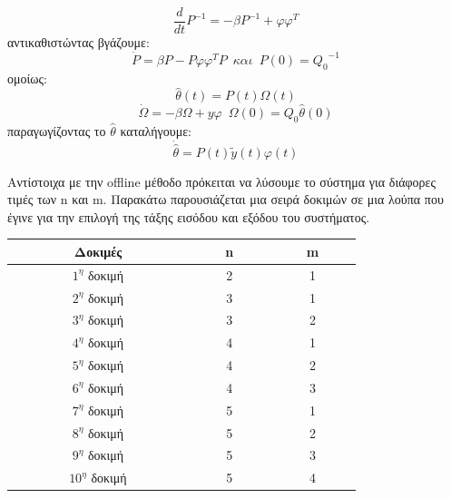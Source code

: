 \documentclass{article}
\begin{document}
\begin{equation*}
\frac{d}{dt}P^{-1} = -β P^{-1} + φφ^T
\end{equation*}
αντικαθιστώντας βγάζουμε:
\begin{equation*}
\boxed{\dot{P}=βP - Pφ φ^T P}\enspace και\enspace P(0)={Q_0}^{-1}
\end{equation*}
ομοίως:
\begin{equation*}
\hat{θ}(t) = P(t)Ω(t)
\end{equation*}
\begin{equation*}
\dot{Ω} = -βΩ +yφ \enspace Ω(0) = Q_0 \hat{θ}(0)
\end{equation*}
παραγωγίζοντας το $\hat{θ}$ καταλήγουμε:
\begin{equation*}
\boxed{
\dot{\hat{θ}} = P(t)\tilde{y}(t)φ(t)
}
\end{equation*}

\par Αντίστοιχα με την offline μέθοδο πρόκειται να λύσουμε το σύστημα για διάφορες τιμές των n και m. Παρακάτω παρουσιάζεται μια σειρά δοκιμών σε μια λούπα που έγινε για την επιλογή της τάξης εισόδου και εξόδου του συστήματος. 
\begin{center}
\begin{tabular}{ |c|c|c| } 
 \hline
$\qquad$ $\qquad$ Δοκιμές $\qquad$ $\qquad$ &$\qquad$ n $\qquad$& $\qquad$ m $\qquad$ \\ 
  \hline
 $1^{η}$ δοκιμή & 2 & 1 \\ 
  \hline
  $2^{η}$ δοκιμή & 3 & 1 \\ 
  \hline
   $3^{η}$ δοκιμή & 3 & 2 \\ 
  \hline
   $4^{η}$ δοκιμή & 4 & 1 \\ 
  \hline
   $5^{η}$ δοκιμή & 4 & 2 \\ 
  \hline
   $6^{η}$ δοκιμή & 4 & 3 \\ 
  \hline
  $7^{η}$ δοκιμή & 5 & 1 \\ 
  \hline
  $8^{η}$ δοκιμή & 5 & 2 \\ 
  \hline
  $9^{η}$ δοκιμή & 5 & 3 \\ 
  \hline
  $10^{η}$ δοκιμή & 5 & 4 \\ 
  \hline
\end{tabular}
\end{center}
\end{document}
